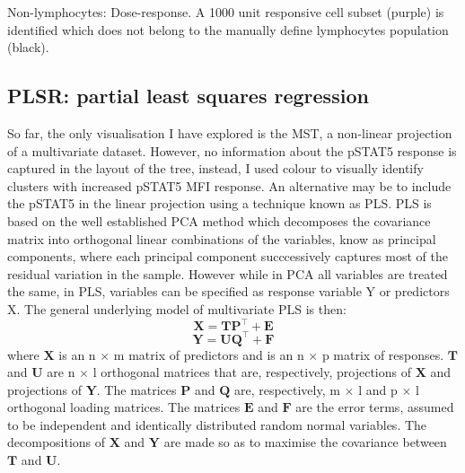 { Non-lymphocytes: Dose-response. }
{
 A 1000 unit responsive cell subset (purple) is identified which does not belong to the manually define lymphocytes population (black).
}


\clearpage


\subsection{PLSR: partial least squares regression}

So far, the only visualisation I have explored is the \gls{MST}, a non-linear projection of a multivariate dataset.
However, no information about the pSTAT5 response is captured in the layout of the tree, instead, I used colour to visually identify clusters with increased pSTAT5 MFI response.
An alternative may be to include the pSTAT5 in the linear projection using a technique known as \acrfull{PLS}.
\gls{PLS} is based on the well established \gls{PCA} method which decomposes the covariance matrix into orthogonal linear combinations of the variables, know as principal components, where each principal component succcessively captures most of the residual variation in the sample.
However while in PCA all variables are treated the same, in PLS, variables can be specified as response variable Y or predictors X.
The general underlying model of multivariate PLS is then:
\[
    \pmb{X} = \pmb{T} \pmb{P}^{\top} + \pmb{E}
\]
\[
    \pmb{Y} = \pmb{U} \pmb{Q}^{\top} + \pmb{F}
\]
where $\pmb{X}$ is an n $\times$ m matrix of predictors and  is an n $\times$ p matrix of responses.
$\pmb{T}$ and $\pmb{U}$ are n $\times$ l orthogonal matrices that are, respectively, projections of $\pmb{X}$ and projections of $\pmb{Y}$.
The matrices $\pmb{P}$ and $\pmb{Q}$ are, respectively, m $\times$ l and p $\times$ l orthogonal loading matrices.
The matrices $\pmb{E}$ and $\pmb{F}$ are the error terms, assumed to be independent and identically distributed random normal variables.  
The decompositions of $\pmb{X}$ and $\pmb{Y}$ are made so as to maximise the covariance between $\pmb{T}$ and $\pmb{U}$.

